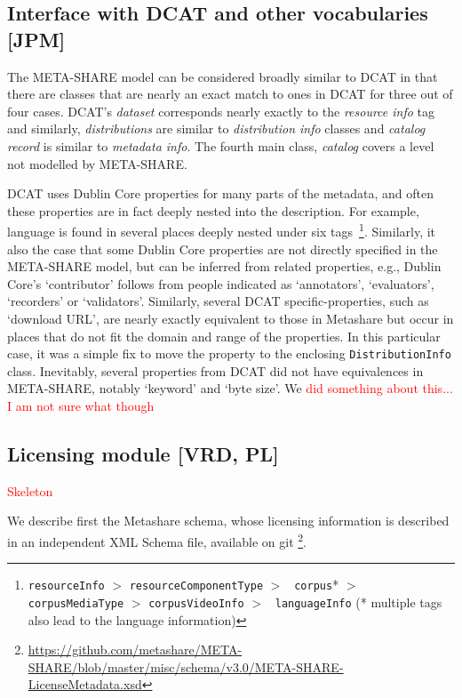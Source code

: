 \documentclass{llncs}
\begin{document}
\subsection{Interface with DCAT and other vocabularies [JPM]}
\label{sec:dcat}

The META-SHARE model can be considered broadly similar to DCAT in that there are
classes that are nearly an exact match to ones in DCAT for three out of four
cases. DCAT's \emph{dataset} corresponds nearly exactly to the \emph{resource
info} tag and similarly, \emph{distributions} are similar to \emph{distribution
info} classes and \emph{catalog record} is similar to \emph{metadata info}. The
fourth main class, \emph{catalog} covers a level not modelled by META-SHARE. 

DCAT uses Dublin Core properties for many parts of the metadata, and often these
properties are in fact deeply nested into the description. For example, language
is found in several places deeply nested under six
tags~\footnote{{\tt resourceInfo} $>$ {\tt resourceComponentType} $>$ {\tt
    corpus}* $>$ {\tt corpusMediaType} $>$ {\tt corpusVideoInfo} $>$ {\tt
languageInfo} (* multiple tags also lead to the language information)}.
Similarly, it also the case that some Dublin Core properties are not directly
specified in the META-SHARE model, but can be inferred from related properties,
e.g., Dublin Core's `contributor' follows from people indicated as `annotators',
`evaluators', `recorders' or `validators'. Similarly, several DCAT specific-properties, such as `download URL', are nearly
exactly equivalent to those in Metashare but occur in places that do not fit the
domain and range of the properties. In this particular case, it was a simple fix
to move the property to the enclosing {\tt DistributionInfo} class.
Inevitably, several properties from DCAT did not have equivalences in
META-SHARE, notably `keyword' and `byte size'. We \textcolor{red}{did something
about this... I am not sure what though}

\subsection{Licensing module [VRD, PL]}
\label{sec:licensing}
\textcolor{red}{Skeleton}

We describe first the Metashare schema, whose licensing information is described in an independent XML Schema file, available on git \footnote{\url{https://github.com/metashare/META-SHARE/blob/master/misc/schema/v3.0/META-SHARE-LicenseMetadata.xsd}}. 
\end{document}
